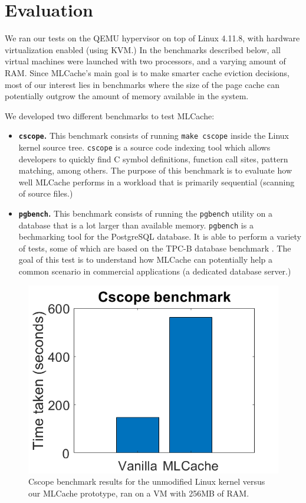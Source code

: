\section{Evaluation}

We ran our tests on the QEMU \cite{qemu} hypervisor on top of Linux 4.11.8,
with hardware virtualization enabled (using KVM.) In the benchmarks described
below, all virtual machines were launched with two processors, and a varying
amount of RAM. Since MLCache's main goal is to make smarter cache eviction
decisions, most of our interest lies in benchmarks where the size of the page
cache can potentially outgrow the amount of memory available in the system.

We developed two different benchmarks to test MLCache:

\begin{itemize}
  \item \textbf{\texttt{cscope}.} This benchmark consists of running \texttt{make cscope}
    inside the Linux kernel source tree. \texttt{cscope} is a source code indexing
    tool which allows developers to quickly find C symbol definitions, function call
    sites, pattern matching, among others. The purpose of this benchmark is to evaluate
    how well MLCache performs in a workload that is primarily sequential (scanning of
    source files.)
  \item \textbf{\texttt{pgbench}.} This benchmark consists of running the \texttt{pgbench}
    utility on a database that is a lot larger than available memory. \texttt{pgbench} is a bechmarking
    tool for the PostgreSQL database. It is able to perform a variety of tests, some of
    which are based on the TPC-B database benchmark \cite{tpcb}.  The goal of this test is to
    understand how MLCache can potentially help a common scenario in commercial applications
    (a dedicated database server.)
\end{itemize}

\label{fig:cscope}
\begin{figure}[h]
	\includegraphics[scale=0.4]{img/cscope_results_bigger.png}
	\caption{Cscope benchmark results for the unmodified Linux kernel versus our MLCache prototype, ran on a VM with 256MB of RAM.}
\end{figure}

